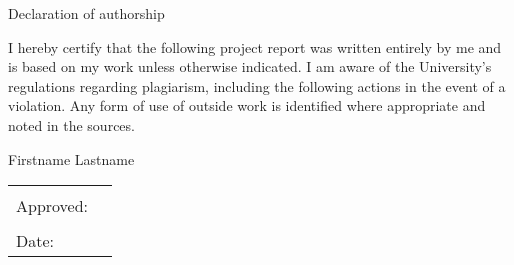 
\begin{center}
\large
Declaration of authorship
\end{center}

\noindent I hereby certify that the following project report was written entirely by me and is based on my work unless otherwise indicated. I am aware of the University's regulations regarding plagiarism, including the following actions in the event of a violation. Any form of use of outside work is identified where appropriate and noted in the sources.

\vspace{1cm}

\begin{center}
\large
Firstname Lastname
\end{center}

\begin{tabular}{p{5cm}p{10cm}}
& \\
Approved: & \hrulefill \\
& \\
Date: & \hrulefill \\
\end{tabular}